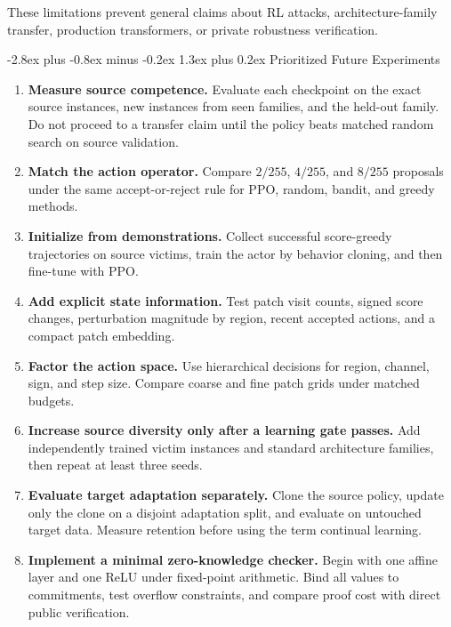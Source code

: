 \documentclass[11pt,a4paper]{article}
\makeatletter
\renewcommand\section{\@startsection{section}{1}{0pt}
  {-2.8ex plus -0.8ex minus -0.2ex}
  {1.3ex plus 0.2ex}
  {\normalfont\large\bfseries\color{researchnavy}}}
\makeatother
\begin{document}
These limitations prevent general claims about RL attacks, architecture-family transfer, production transformers, or private robustness verification.

\section{Prioritized Future Experiments}

\begin{enumerate}
  \item \textbf{Measure source competence.}
  Evaluate each checkpoint on the exact source instances, new instances from seen families, and the held-out family. Do not proceed to a transfer claim until the policy beats matched random search on source validation.

  \item \textbf{Match the action operator.}
  Compare \(2/255\), \(4/255\), and \(8/255\) proposals under the same accept-or-reject rule for PPO, random, bandit, and greedy methods.

  \item \textbf{Initialize from demonstrations.}
  Collect successful score-greedy trajectories on source victims, train the actor by behavior cloning, and then fine-tune with PPO.

  \item \textbf{Add explicit state information.}
  Test patch visit counts, signed score changes, perturbation magnitude by region, recent accepted actions, and a compact patch embedding.

  \item \textbf{Factor the action space.}
  Use hierarchical decisions for region, channel, sign, and step size. Compare coarse and fine patch grids under matched budgets.

  \item \textbf{Increase source diversity only after a learning gate passes.}
  Add independently trained victim instances and standard architecture families, then repeat at least three seeds.

  \item \textbf{Evaluate target adaptation separately.}
  Clone the source policy, update only the clone on a disjoint adaptation split, and evaluate on untouched target data. Measure retention before using the term continual learning.

  \item \textbf{Implement a minimal zero-knowledge checker.}
  Begin with one affine layer and one ReLU under fixed-point arithmetic. Bind all values to commitments, test overflow constraints, and compare proof cost with direct public verification.
\end{enumerate}
\end{document}
